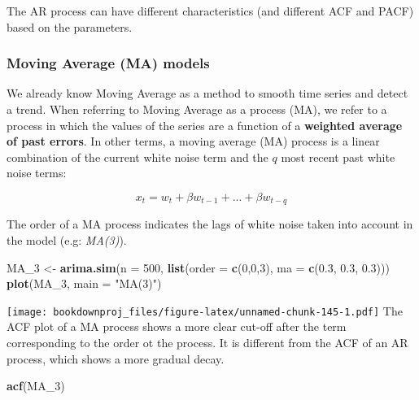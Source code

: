 \documentclass[
]{article}
\newenvironment{Shaded}{\begin{snugshade}}{\end{snugshade}}
\newcommand{\DataTypeTok}[1]{\textcolor[rgb]{0.13,0.29,0.53}{#1}}
\newcommand{\DecValTok}[1]{\textcolor[rgb]{0.00,0.00,0.81}{#1}}
\newcommand{\FloatTok}[1]{\textcolor[rgb]{0.00,0.00,0.81}{#1}}
\newcommand{\KeywordTok}[1]{\textcolor[rgb]{0.13,0.29,0.53}{\textbf{#1}}}
\newcommand{\NormalTok}[1]{#1}
\newcommand{\StringTok}[1]{\textcolor[rgb]{0.31,0.60,0.02}{#1}}
\begin{document}
The AR process can have different characteristics (and different ACF and PACF) based on the parameters.

\hypertarget{moving-average-ma-models}{%
\subsubsection{Moving Average (MA) models}\label{moving-average-ma-models}}

We already know Moving Average as a method to smooth time series and detect a trend. When referring to Moving Average as a process (MA), we refer to a process in which the values of the series are a function of a \textbf{weighted average of past errors}. In other terms, a moving average (MA) process is a linear combination of the current white noise term and the \(q\) most recent past white noise terms:

\[
{x_t} = w_t + \beta w_{t-1} + ... + \beta w_{t-q}
\]

The order of a MA process indicates the lags of white noise taken into account in the model (e.g: \emph{MA(3)}).

\begin{Shaded}
\begin{Highlighting}[]
\NormalTok{MA_}\DecValTok{3}\NormalTok{ <-}\StringTok{ }\KeywordTok{arima.sim}\NormalTok{(}\DataTypeTok{n =} \DecValTok{500}\NormalTok{, }\KeywordTok{list}\NormalTok{(}\DataTypeTok{order =} \KeywordTok{c}\NormalTok{(}\DecValTok{0}\NormalTok{,}\DecValTok{0}\NormalTok{,}\DecValTok{3}\NormalTok{), }\DataTypeTok{ma =} \KeywordTok{c}\NormalTok{(}\FloatTok{0.3}\NormalTok{, }\FloatTok{0.3}\NormalTok{, }\FloatTok{0.3}\NormalTok{)))}
\KeywordTok{plot}\NormalTok{(MA_}\DecValTok{3}\NormalTok{, }\DataTypeTok{main =} \StringTok{"MA(3)"}\NormalTok{)}
\end{Highlighting}
\end{Shaded}

\texttt{[image: bookdownproj\_files/figure-latex/unnamed-chunk-145-1.pdf]}
The ACF plot of a MA process shows a more clear cut-off after the term corresponding to the order ot the process. It is different from the ACF of an AR process, which shows a more gradual decay.

\begin{Shaded}
\begin{Highlighting}[]
\KeywordTok{acf}\NormalTok{(MA_}\DecValTok{3}\NormalTok{)}
\end{Highlighting}
\end{Shaded}
\end{document}
